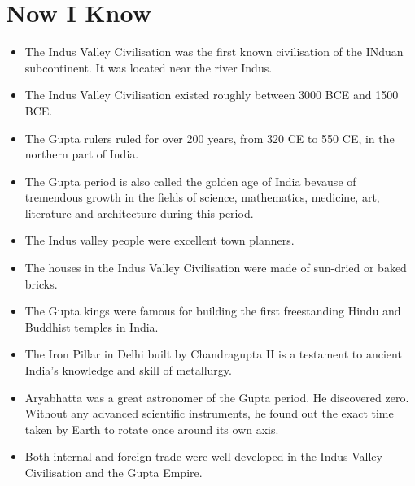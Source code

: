 \section{Now I Know}
\begin{itemize}
    \item The Indus Valley Civilisation was the first known civilisation of the INduan subcontinent. It was located near the river Indus.
    \item The Indus Valley Civilisation existed roughly between 3000 BCE and 1500 BCE.
    \item The Gupta rulers ruled for over 200 years, from 320 CE to 550 CE, in the northern part of India.
    \item The Gupta period is also called the golden age of India bevause of tremendous growth in the fields of science, mathematics, medicine, art, literature and architecture during this period.
    \item The Indus valley people were excellent town planners.
    \item The houses in the Indus Valley Civilisation were made of sun-dried or baked bricks.
    \item The Gupta kings were famous for building the first freestanding Hindu and Buddhist temples in India.
    \item The Iron Pillar in Delhi built by Chandragupta II is a testament to ancient India's knowledge and skill of metallurgy.
    \item Aryabhatta was a great astronomer of the Gupta period. He discovered zero. Without any advanced scientific instruments, he found out the exact time taken by Earth to rotate once around its own axis.
    \item Both internal and foreign trade were well developed in the Indus Valley Civilisation and the Gupta Empire.
\end{itemize}